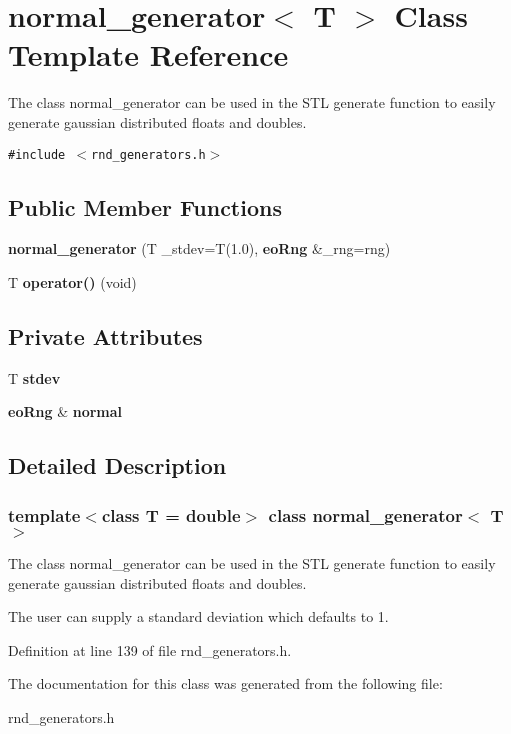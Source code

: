 \section{normal\_\-generator$<$ T $>$ Class Template Reference}
\label{classnormal__generator}
The class normal\_\-generator can be used in the STL generate function to easily generate gaussian distributed floats and doubles.  


{\tt \#include $<$rnd\_\-generators.h$>$}

\subsection*{Public Member Functions}
\begin{CompactItemize}
\item 
{\bf normal\_\-generator} (T \_\-stdev=T(1.0), {\bf eo\-Rng} \&\_\-rng=rng)\label{classnormal__generator_a0}

\item 
T {\bf operator()} (void)\label{classnormal__generator_a1}

\end{CompactItemize}
\subsection*{Private Attributes}
\begin{CompactItemize}
\item 
T {\bf stdev}\label{classnormal__generator_r0}

\item 
{\bf eo\-Rng} \& {\bf normal}\label{classnormal__generator_r1}

\end{CompactItemize}


\subsection{Detailed Description}
\subsubsection*{template$<$class T = double$>$ class normal\_\-generator$<$ T $>$}

The class normal\_\-generator can be used in the STL generate function to easily generate gaussian distributed floats and doubles. 

The user can supply a standard deviation which defaults to 1. 



Definition at line 139 of file rnd\_\-generators.h.

The documentation for this class was generated from the following file:\begin{CompactItemize}
\item 
rnd\_\-generators.h\end{CompactItemize}
